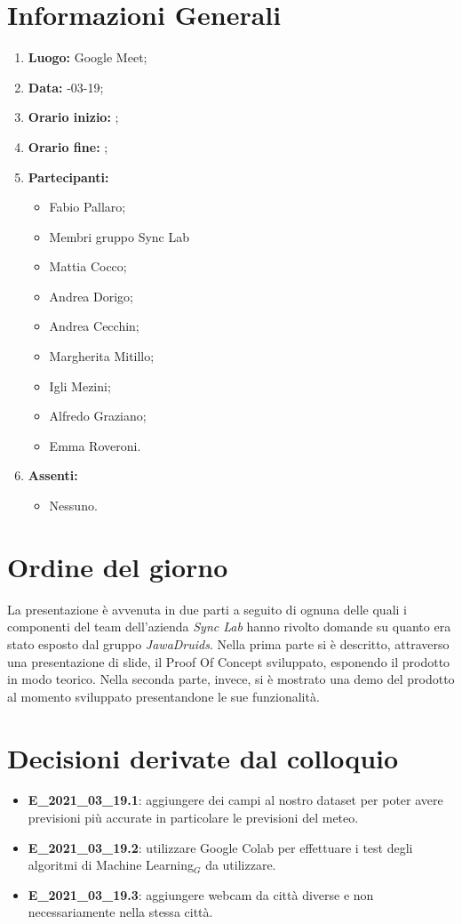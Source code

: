 \newpage
\section{Informazioni Generali}
\begin{enumerate}
	\item \textbf{Luogo:} \normalfont Google Meet;
	\item \textbf{Data:} -03-19;
	\item \textbf{Orario inizio:} ;
	\item \textbf{Orario fine:} ;
	\item \textbf{Partecipanti:}
	\begin{itemize}
		\item Fabio Pallaro;
		\item Membri gruppo Sync Lab
		\item Mattia Cocco;
		\item Andrea Dorigo;
		\item Andrea Cecchin;
		\item Margherita Mitillo;
		\item Igli Mezini;
		\item Alfredo Graziano;
		\item Emma Roveroni.
	\end{itemize}
	\item \textbf{Assenti:}
	\begin{itemize}
		\item Nessuno.
	\end{itemize}
\end{enumerate}
\section{Ordine del giorno}
La presentazione è avvenuta in due parti a seguito di ognuna delle quali i componenti del team dell'azienda \textit{Sync Lab} hanno rivolto domande su quanto era stato esposto dal gruppo \textit{JawaDruids}. Nella prima parte si è descritto, attraverso una presentazione di slide, il Proof Of Concept sviluppato, esponendo il prodotto in modo teorico. Nella seconda parte, invece, si è mostrato una demo del prodotto al momento sviluppato presentandone le sue funzionalità. 
\section{Decisioni derivate dal colloquio}
\begin{itemize}
	\item \textbf{E\_2021\_03\_19.1}: aggiungere dei campi al nostro dataset per poter avere previsioni più accurate in particolare le previsioni del meteo.
\end{itemize}
\begin{itemize}
	\item \textbf{E\_2021\_03\_19.2}: utilizzare Google Colab per effettuare i test degli algoritmi di Machine Learning$_G$ da utilizzare.
\end{itemize}
\begin{itemize}
	\item \textbf{E\_2021\_03\_19.3}: aggiungere webcam da città diverse e non necessariamente nella stessa città.
\end{itemize}